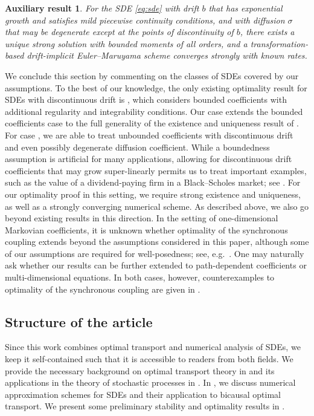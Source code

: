 \documentclass[onseside, final]{amsart}
\newtheorem*{auxresult*}{Auxiliary result}
\theoremstyle{definition}
\numberwithin{equation}{section}
\begin{document}
	\begin{auxresult*}
		For the SDE \eqref{eq:sde} with drift $b$ that has exponential growth and satisfies mild piecewise continuity conditions, and with diffusion $\sigma$ that may be degenerate except at the points of discontinuity of $b$, there exists a unique strong solution with bounded moments of all orders, and a transformation-based drift-implicit Euler--Maruyama scheme converges strongly with known rates.
	\end{auxresult*}	
	
	We conclude this section by commenting on the classes of SDEs covered by our assumptions. To the best of our knowledge, the only existing optimality result for SDEs with discontinuous drift is \cite[Proposition 3.30]{BaKaRo22}, which considers bounded coefficients with additional regularity and integrability conditions. Our case  extends the bounded coefficients case to the full generality of the existence and uniqueness result of \citet{Zv74}. For case , we are able to treat unbounded coefficients with discontinuous drift and even possibly degenerate diffusion coefficient. While a boundedness assumption is artificial for many applications, allowing for discontinuous drift coefficients that may grow super-linearly permits us to treat important examples, such as the value of a dividend-paying firm in a Black--Scholes market; see . For our optimality proof in this setting, we require strong existence and uniqueness, as well as a strongly converging numerical scheme. As described above, we also go beyond existing results in this direction. In the setting of one-dimensional Markovian coefficients, it is unknown whether optimality of the synchronous coupling extends beyond the assumptions considered in this paper, although some of our assumptions are required for well-posedness; see, e.g.\ .
	One may naturally ask whether our results can be further extended to path-dependent coefficients or multi-dimensional equations. In both cases, however, counterexamples to optimality of the synchronous coupling are given in \cite[Section 5]{BaKaRo22}.
		
		\subsection{Structure of the article}
			Since this work combines optimal transport and numerical analysis of SDEs, we keep it self-contained such that it is accessible to readers from both fields. We provide the necessary background on optimal transport theory in  and its applications in the theory of stochastic processes in . In , we discuss numerical approximation schemes for SDEs and their application to bicausal optimal transport. We present some preliminary stability and optimality results in .
			
\end{document}
